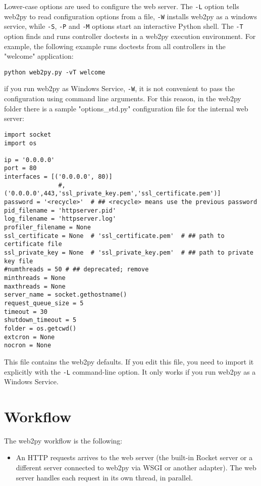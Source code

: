 \documentclass[justified,sixbynine,notoc]{tufte-book}
\def\ft{\small\tt}
\begin{document}
\begin{fullwidth}
Lower-case options are used to configure the web server. The {\ft -L} option tells web2py to read configuration options from a file, {\ft -W} installs web2py as a windows service, while {\ft -S}, {\ft -P} and {\ft -M} options start an interactive Python shell. The {\ft -T} option finds and runs controller doctests in a web2py execution environment. For example, the following example runs doctests from all controllers in the "welcome" application:
\begin{lstlisting}
python web2py.py -vT welcome
\end{lstlisting}
\noindent if you run web2py as Windows Service, {\ft -W},  it is not convenient to pass the configuration using command line arguments. For this reason, in the web2py folder there is a sample "options\_std.py" configuration file for the internal web server:

\begin{lstlisting}
import socket
import os

ip = '0.0.0.0'
port = 80
interfaces = [('0.0.0.0', 80)]
               #,('0.0.0.0',443,'ssl_private_key.pem','ssl_certificate.pem')]
password = '<recycle>'  # ## <recycle> means use the previous password
pid_filename = 'httpserver.pid'
log_filename = 'httpserver.log'
profiler_filename = None
ssl_certificate = None  # 'ssl_certificate.pem'  # ## path to certificate file
ssl_private_key = None  # 'ssl_private_key.pem'  # ## path to private key file
#numthreads = 50 # ## deprecated; remove
minthreads = None
maxthreads = None
server_name = socket.gethostname()
request_queue_size = 5
timeout = 30
shutdown_timeout = 5
folder = os.getcwd()
extcron = None
nocron = None
\end{lstlisting}

This file contains the web2py defaults. If you edit this file, you need to import it explicitly with the {\ft -L} command-line option. It only works if you run web2py as a Windows Service.

\goodbreak\section{Workflow}

The web2py workflow is the following:
\begin{itemize}
\item An HTTP requests arrives to the web server (the built-in Rocket server or a different server connected to web2py via WSGI or another adapter). The web server handles each request in its own thread, in parallel.


\end{itemize}
\end{fullwidth}
\end{document}

